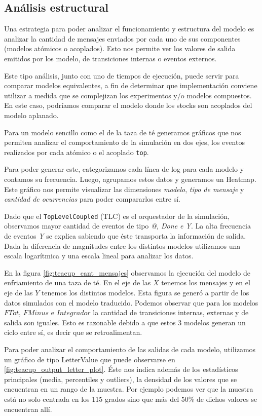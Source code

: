 \subsection{Análisis estructural}
Una estrategia para poder analizar el funcionamiento y estructura del modelo es analizar la
cantidad de mensajes enviados por cada uno de sus componentes (modelos atómicos o acoplados). 
Esto nos permite ver los valores de salida emitidos por los modelo, de transiciones internas o eventos
externos.

Este tipo análisis, junto con uno de tiempos de ejecución, puede servir para comparar modelos equivalentes, a fin de determinar que implementación conviene utilizar a medida que se complejizan los experimentos y/o modelos compuestos. En este caso, podríamos comparar el modelo donde los stocks son acoplados del modelo aplanado.

Para un modelo sencillo como el de la taza de té generamos gráficos que nos
permiten analizar el comportamiento de la simulación en dos ejes, los eventos
realizados por cada atómico o el acoplado \texttt{top}.

Para poder generar este, categorizamos cada línea de log para cada modelo y
contamos su frecuencia. Luego, agrupamos estos datos y generamos un Heatmap.
Este gráfico nos permite visualizar las dimensiones \textit{modelo}, \textit{tipo de mensaje} y
\textit{cantidad de ocurrencias} para poder compararlos entre sí.

Dado que el \texttt{TopLevelCoupled} (TLC)  es el orquestador de la simulación,
observamos mayor cantidad de eventos de tipo \textit{@, Done e Y}. La alta
frecuencia de eventos \textit{Y} se explica sabiendo que éste  transporta la
información de salida. Dada la diferencia de magnitudes entre los distintos
modelos utilizamos una escala logarítmica y una escala lineal para analizar los
datos.

En la figura \ref{fig:teacup_cant_mensajes} observamos la  ejecución del modelo
de enfriamiento de una taza de té. En el eje de las $X$ tenemos los mensajes 
y en el eje de las $Y$ tenemos los distintos modelos. 
Esta figura se generó a partir de los datos simulados con el modelo traducido.
Podemos observar que para los modelos $FTot$, $FMinus$ e $Integrador$ la cantidad 
de transiciones internas, externas y de salida son iguales. Esto es razonable 
debido a que estos 3 modelos generan un ciclo entre sí, es decir que se retroalimentan.

Para poder analizar el comportamiento de las salidas de cada modelo, utilizamos
un gráfico de tipo LetterValue que puede observarse en \ref{fig:teacup_output_letter_plot}.
Éste nos indica además de los estadísticos principales (media, percentiles y outliers), 
la densidad de los valores que se encuentran en un rango de la muestra. 
Por ejemplo podemos ver que la muestra está no solo centrada en los 115 grados sino que 
más del 50\% de dichos valores se encuentran allí. 

